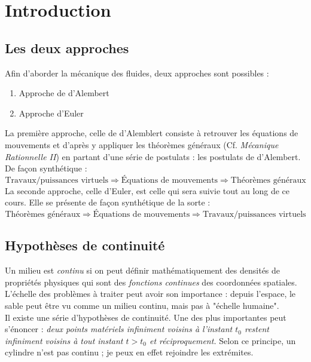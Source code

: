 \chapter{Introduction}

\section*{Les deux approches}
    Afin d'aborder la mécanique des fluides, deux approches sont possibles :
    \begin{enumerate}
    \item Approche de d'Alembert
    \item Approche d'Euler
    \end{enumerate}
    
    La première approche, celle de d'Alemblert consiste à retrouver les équations de mouvements
    et d'après y appliquer les théorèmes généraux (Cf. \textit{Mécanique Rationnelle II}) en
    partant d'une série de postulats : les postulats de d'Alembert. De façon synthétique :
    $$ \text{Travaux/puissances virtuels}  \Rightarrow \text{Équations
    de mouvements} \Rightarrow \text{Théorèmes généraux}$$
    La seconde approche, celle d'Euler, est celle qui sera suivie tout au long de ce cours. Elle
    se présente de façon synthétique de la sorte :
    $$ \text{Théorèmes généraux}  \Rightarrow \text{Équations
    de mouvements} \Rightarrow \text{Travaux/puissances virtuels}$$
    
    
\section*{Hypothèses de continuité}  
    Un milieu est \textit{continu} si on peut définir mathématiquement des densités de propriétés
    physiques qui sont des \textit{fonctions continues} des coordonnées spatiales.\\ L'échelle des
    problèmes à traiter peut avoir son importance : depuis l'espace, le sable peut être vu comme
    un milieu continu, mais pas à "échelle humaine".\\
    
    Il existe une série d'hypothèses de continuité. Une des plus importantes peut s'énoncer : 
    \textit{deux points matériels infiniment voisins à l'instant $t_0$ restent infiniment voisins
    à tout instant $t > t_0$ et réciproquement.} Selon ce principe, un cylindre n'est pas continu ;
    je peux en effet rejoindre les extrémites.\\
    
